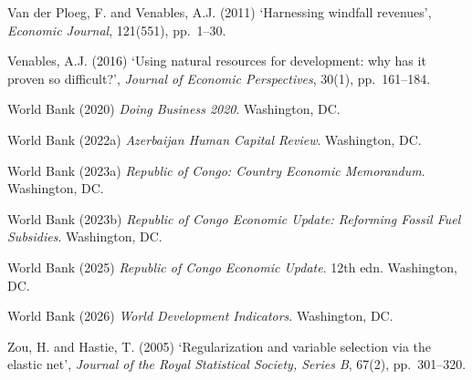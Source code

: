 \documentclass[12pt,a4paper]{report}
\begin{document}
\begin{flushleft}
Van der Ploeg, F. and Venables, A.J. (2011) `Harnessing windfall revenues', \textit{Economic Journal}, 121(551), pp.~1--30.

Venables, A.J. (2016) `Using natural resources for development: why has it proven so difficult?', \textit{Journal of Economic Perspectives}, 30(1), pp.~161--184.

World Bank (2020) \textit{Doing Business 2020}. Washington, DC.

World Bank (2022a) \textit{Azerbaijan Human Capital Review}. Washington, DC.

World Bank (2023a) \textit{Republic of Congo: Country Economic Memorandum}. Washington, DC.

World Bank (2023b) \textit{Republic of Congo Economic Update: Reforming Fossil Fuel Subsidies}. Washington, DC.

World Bank (2025) \textit{Republic of Congo Economic Update}. 12th edn. Washington, DC.

World Bank (2026) \textit{World Development Indicators}. Washington, DC.

Zou, H. and Hastie, T. (2005) `Regularization and variable selection via the elastic net', \textit{Journal of the Royal Statistical Society, Series B}, 67(2), pp.~301--320.

\end{flushleft}
\end{document}
